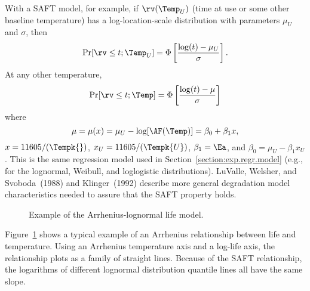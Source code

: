 With a SAFT model, for example, if $\rv(\Temp_{U})$ (time at
use or some other baseline temperature) has a log-location-scale
distribution with parameters $\mu_{U}$ and $\sigma$, then
\begin{displaymath}
\Pr[\rv \leq t ;\Temp_{U} ] = 
	\Phi \left[\frac{\log(t)-\mu_{U}}{\sigma} \right].
\end{displaymath}
At any other temperature,
\begin{displaymath}
\Pr[\rv \leq t ; \Temp ] = \Phi \left[\frac{\log(t)-\mu}{\sigma} \right]
\end{displaymath}
where 
\begin{equation}
\label{equation:saft.mu.def}
\mu = \mu(x) = \mu_{U}-\log[\AF(\Temp)]=\beta_{0}+ \beta_{1} x,
\end{equation}
$x=11605/(\Tempk{})$, $x_{U}=11605/(\Tempk{U})$, $\beta_{1}=\Ea$,
and $\beta_{0}=\mu_{U}-\beta_{1}x_{U}$.  This is the same regression
model used in Section~\ref{section:exp.regr.model} (e.g., for the
lognormal, Weibull, and loglogistic distributions). LuValle,
Welsher, and Svoboda~(1988) and Klinger~(1992) describe more general
degradation model characteristics needed to assure that the SAFT
property holds. 
\begin{figure}
\caption{Example of the Arrhenius-lognormal life model.}
\label{figure:arrhenius.alt.ps}
\end{figure}
Figure~\ref{figure:arrhenius.alt.ps} shows a typical example of an
Arrhenius relationship between life and temperature. Using an Arrhenius
temperature axis and a log-life axis, the relationship plots as a family of
straight lines. Because of the SAFT relationship, the logarithms of
different lognormal distribution quantile lines all have the same slope.


